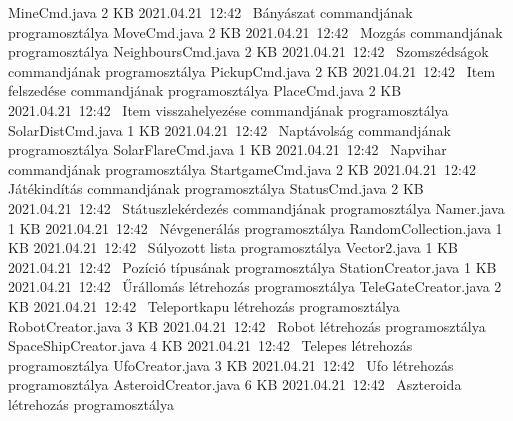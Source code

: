 \documentclass[../../projlab]{subfiles}
\begin{document}
\begin{fajllista}
	\fajl
    {MineCmd.java} %
    {2 KB} %
    {2021.04.21~12:42~} %
    {Bányászat commandjának programosztálya} %
	\fajl
    {MoveCmd.java} %
    {2 KB} %
    {2021.04.21~12:42~} %
    {Mozgás commandjának programosztálya} %
	\fajl
    {NeighboursCmd.java} %
    {2 KB} %
    {2021.04.21~12:42~} %
    {Szomszédságok commandjának programosztálya} %
	\fajl
    {PickupCmd.java} %
    {2 KB} %
    {2021.04.21~12:42~} %
    {Item felszedése commandjának programosztálya} %
	\fajl
    {PlaceCmd.java} %
    {2 KB} %
    {2021.04.21~12:42~} %
    {Item visszahelyezése commandjának programosztálya} %
	\fajl
    {SolarDistCmd.java} %
    {1 KB} %
    {2021.04.21~12:42~} %
    {Naptávolság commandjának programosztálya} %
	\fajl
    {SolarFlareCmd.java} %
    {1 KB} %
    {2021.04.21~12:42~} %
    {Napvihar commandjának programosztálya} %
	\fajl
    {StartgameCmd.java} %
    {2 KB} %
    {2021.04.21~12:42~} %
    {Játékindítás commandjának programosztálya} %
	\fajl
    {StatusCmd.java} %
    {2 KB} %
    {2021.04.21~12:42~} %
    {Státuszlekérdezés commandjának programosztálya} %
	\fajl
    {Namer.java} %
    {1 KB} %
    {2021.04.21~12:42~} %
    {Névgenerálás programosztálya} %
	\fajl
	{RandomCollection.java} %
    {1 KB} %
    {2021.04.21~12:42~} %
    {Súlyozott lista programosztálya} %
	\fajl
	{Vector2.java} %
    {1 KB} %
    {2021.04.21~12:42~} %
    {Pozíció típusának programosztálya} %
	\fajl
	{StationCreator.java} %
    {1 KB} %
    {2021.04.21~12:42~} %
    {Űrállomás létrehozás programosztálya} %
	\fajl
	{TeleGateCreator.java} %
    {2 KB} %
    {2021.04.21~12:42~} %
    {Teleportkapu létrehozás programosztálya} %
	\fajl
	{RobotCreator.java} %
    {3 KB} %
    {2021.04.21~12:42~} %
    {Robot létrehozás programosztálya} %
	\fajl
	{SpaceShipCreator.java} %
    {4 KB} %
    {2021.04.21~12:42~} %
    {Telepes létrehozás programosztálya} %
	\fajl
	{UfoCreator.java} %
    {3 KB} %
    {2021.04.21~12:42~} %
    {Ufo létrehozás programosztálya} %
	\fajl
	{AsteroidCreator.java} %
    {6 KB} %
    {2021.04.21~12:42~} %
    {Aszteroida létrehozás programosztálya} %
	\fajl

\end{fajllista}
\end{document}
